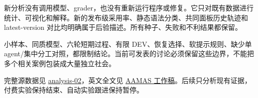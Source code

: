 \documentclass[UTF8,fontset=none,11pt]{ctexart}
\begin{document}
新分析没有调用模型、grader，也没有重新运行程序或修复。它只对既有数据进行统计、可视化和解释。新的发布级采用率、静态语法分类、共同面板历史轨迹和 latest-version 对比均明确属于后验描述。所有种子、失败和不利结果都保留。

小样本、同质模型、六轮短期过程、有限 DEV、恢复选择、软提示规则、缺少单 agent/集中分工对照，都限制结论。当前可发表的讨论必须保留这些边界，不能把多个相关案例包装成大量独立社会。

完整源数据见 \href{https://github.com/xisen-w/boids-evolution/blob/codex/tool-ecology-dynamics/studies/tool_ecology/evidence/v031/analysis-02/README.md}{analysis-02}，英文全文见 \href{https://github.com/xisen-w/boids-evolution/blob/codex/tool-ecology-dynamics/paper/tool-ecology/main.pdf}{AAMAS 工作稿}。后续只分析现有证据，付费实验保持结束、自动实验跟进保持暂停。
\end{document}
